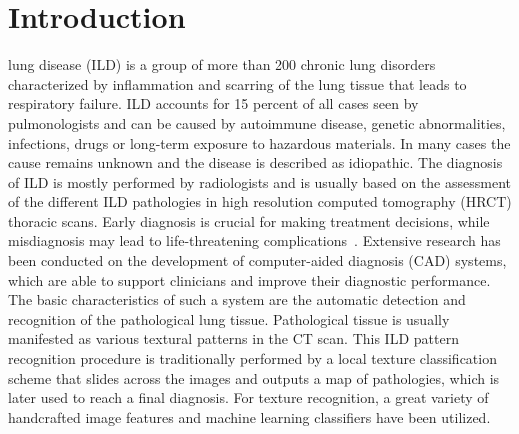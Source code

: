 \documentclass[journal]{IEEEtran}
\begin{document}
\section{Introduction} lung disease (ILD) is a group of more than 200 chronic lung disorders characterized by inflammation and scarring of the lung tissue that leads to respiratory failure. ILD accounts for 15 percent of all cases seen by pulmonologists and can be caused by autoimmune disease, genetic abnormalities, infections, drugs or long-term exposure to hazardous materials. In many cases the cause remains unknown and the disease is described as idiopathic. The diagnosis of ILD is mostly performed by radiologists and is usually based on the assessment of the different ILD pathologies in high resolution computed tomography (HRCT) thoracic scans. Early diagnosis is crucial for making treatment decisions, while misdiagnosis may lead to life-threatening complications~\cite{society1999diagnosis}. Extensive research has been conducted on the development of computer-aided diagnosis (CAD) systems, which are able to support clinicians and improve their diagnostic performance. The basic characteristics of such a system are the automatic detection and recognition of the pathological lung tissue. Pathological tissue is usually manifested as various textural patterns in the CT scan. This ILD pattern recognition procedure is traditionally performed by a local texture classification scheme that slides across the images and outputs a map of pathologies, which is later used to reach a final diagnosis. For texture recognition, a great variety of handcrafted image features and machine learning classifiers have been utilized.
\end{document}
